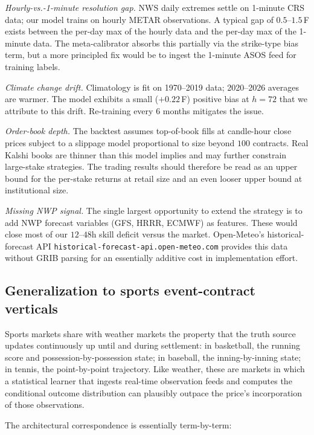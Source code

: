 \documentclass[11pt]{article}
\begin{document}
\textit{Hourly-vs.-1-minute resolution gap.} NWS daily extremes settle on
1-minute CRS data; our model trains on hourly METAR observations. A typical
gap of $0.5$--$1.5$\,\textdegree F exists between the per-day max of the
hourly data and the per-day max of the 1-minute data. The meta-calibrator
absorbs this partially via the strike-type bias term, but a more principled
fix would be to ingest the 1-minute ASOS feed for training labels.

\textit{Climate change drift.} Climatology is fit on 1970--2019 data;
2020--2026 averages are warmer. The model exhibits a small ($+0.22$\,\textdegree F)
positive bias at $h=72$ that we attribute to this drift. Re-training every
$6$ months mitigates the issue.

\textit{Order-book depth.} The backtest assumes top-of-book fills at
candle-hour close prices subject to a slippage model proportional to size
beyond $100$ contracts. Real Kalshi books are thinner than this model
implies and may further constrain large-stake strategies. The trading
results should therefore be read as an upper bound for the per-stake
returns at retail size and an even looser upper bound at institutional
size.

\textit{Missing NWP signal.} The single largest opportunity to extend the
strategy is to add NWP forecast variables (GFS, HRRR, ECMWF) as features.
These would close most of our $12$--$48$h skill deficit versus the market.
Open-Meteo's historical-forecast API \texttt{historical-forecast-api.open-meteo.com}
provides this data without GRIB parsing for an essentially additive cost
in implementation effort.

\subsection{Generalization to sports event-contract verticals}

Sports markets share with weather markets the property that the truth
source updates continuously up until and during settlement: in basketball,
the running score and possession-by-possession state; in baseball, the
inning-by-inning state; in tennis, the point-by-point trajectory. Like
weather, these are markets in which a statistical learner that ingests
real-time observation feeds and computes the conditional outcome
distribution can plausibly outpace the price's incorporation of those
observations.

The architectural correspondence is essentially term-by-term:
\end{document}
